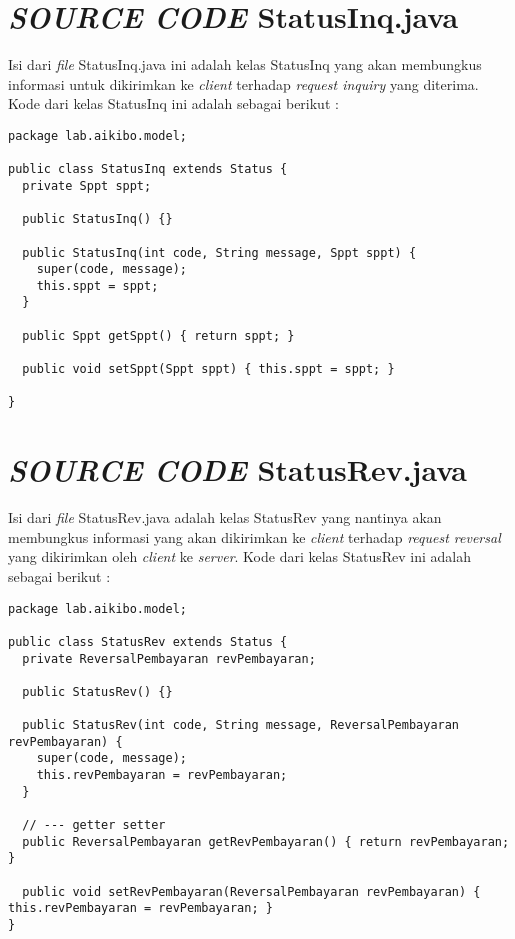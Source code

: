 \documentclass[pdftex,12pt, oneside]{article}
\begin{document}
\section{\textit{SOURCE CODE} StatusInq.java}

Isi dari \textit{file} StatusInq.java ini adalah kelas StatusInq yang akan membungkus informasi untuk dikirimkan ke \textit{client} terhadap \textit{request inquiry} yang diterima. Kode dari kelas StatusInq ini adalah sebagai berikut :

\begin{lstlisting}
package lab.aikibo.model;

public class StatusInq extends Status {
  private Sppt sppt;

  public StatusInq() {}

  public StatusInq(int code, String message, Sppt sppt) {
    super(code, message);
    this.sppt = sppt;
  }

  public Sppt getSppt() { return sppt; }

  public void setSppt(Sppt sppt) { this.sppt = sppt; }

}
\end{lstlisting}


\section{\textit{SOURCE CODE} StatusRev.java}

Isi dari \textit{file} StatusRev.java adalah kelas StatusRev yang nantinya akan membungkus informasi yang akan dikirimkan ke \textit{client} terhadap \textit{request reversal} yang dikirimkan oleh \textit{client} ke \textit{server}. Kode dari kelas StatusRev ini adalah sebagai berikut :

\begin{lstlisting}
package lab.aikibo.model;

public class StatusRev extends Status {
  private ReversalPembayaran revPembayaran;

  public StatusRev() {}

  public StatusRev(int code, String message, ReversalPembayaran revPembayaran) {
    super(code, message);
    this.revPembayaran = revPembayaran;
  }

  // --- getter setter
  public ReversalPembayaran getRevPembayaran() { return revPembayaran; }

  public void setRevPembayaran(ReversalPembayaran revPembayaran) { this.revPembayaran = revPembayaran; }
}
\end{lstlisting}
\end{document}
